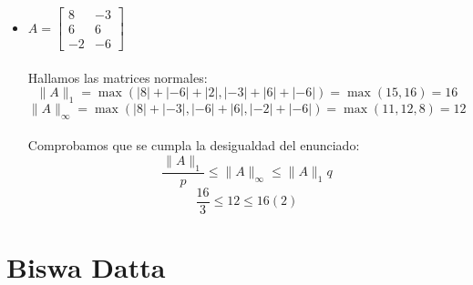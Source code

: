 \documentclass[12pt]{article}
\begin{document}
\begin{itemize}
    \item $A=\left[\begin{array}{cc}
        8&-3\\
        6&6\\
        -2&-6\end{array}\right]$ \\
    \\
    Hallamos las matrices normales:\\
    \[\|A\|_1 = \max{(|8|+|-6|+|2|, |-3|+|6|+|-6|)} = \max{(15,16)} = 16\]
    \[\|A\|_\infty = \max{(|8|+|-3|, |-6|+|6|, |-2|+|-6|)} = \max{(11,12,8)} = 12\]
    \\
    Comprobamos que se cumpla la desigualdad del enunciado:\\
    \[\frac{\|A\|_1}{p}  \leq \|A\|_\infty \leq \|A\|_1 q\]
    \[\frac{16}{3}  \leq 12 \leq 16(2)\]
    
\end{itemize}

%
\section{Biswa Datta}
\end{document}

